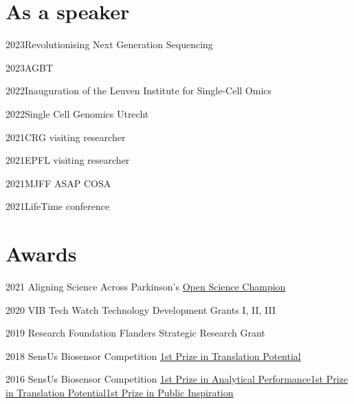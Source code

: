\documentclass{tccv}
\begin{document}
\section{As a speaker}
\begin{compactyearlist}
      \item{2023}{Revolutionising Next Generation Sequencing}
      \item{2023}{AGBT}
      \item{2022}{Inauguration of the Leuven Institute for Single-Cell Omics}
      \item{2022}{Single Cell Genomics Utrecht}
      \item{2021}{CRG visiting researcher}
      \item{2021}{EPFL visiting researcher}
      \item{2021}{MJFF ASAP COSA}
      \item{2021}{LifeTime conference}
\end{compactyearlist}

\section{Awards}
\begin{yearlist}
    \item{2021}
          {Aligning Science Across Parkinson's}
          {\href{https://parkinsonsroadmap.org/open-science-champions/}{Open Science Champion}}
    \item{2020}
          {VIB Tech Watch}
          {Technology Development Grants I, II, III}
    \item{2019}
          {Research Foundation Flanders}
          {Strategic Research Grant}
    \item{2018}
          {SensUs Biosensor Competition}
          {\href{https://www.sensus.org/archive/2018}{1st Prize in Translation Potential}}
    \item{2016}
          {SensUs Biosensor Competition}
          {\href{https://www.sensus.org/archive/2016}{1st Prize in Analytical Performance\newline1st Prize in Translation Potential\newline1st Prize in Public Inspiration}}
\end{yearlist}

\newpage
\end{document}
